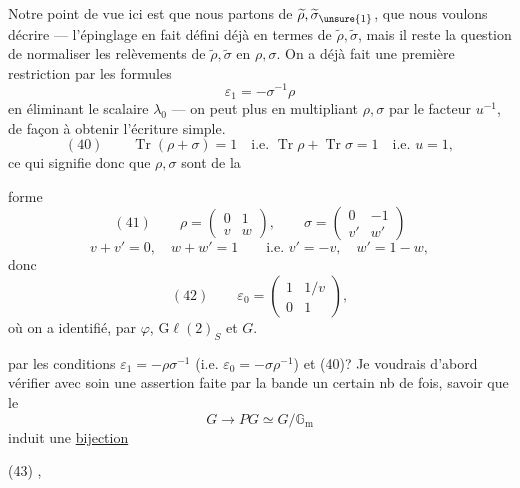 
Notre point de vue ici est que nous partons de $\widetilde\rho,\widetilde\sigma_{\unsure{1}}$, que nous voulons décrire --- l'épinglage  en fait défini déjà en termes de $\widetilde\rho,\widetilde\sigma$, mais il reste la question de normaliser les relèvements de $\widetilde\rho,\widetilde\sigma$ en $\rho,\sigma$. On a déjà fait une première restriction par les formules
\[
\varepsilon_1=-\sigma^{-1}\rho
\]
en éliminant le  scalaire $\lambda_0$ --- on peut  plus en multipliant $\rho,\sigma$ par le facteur $u^{-1}$, de façon à obtenir l'écriture simple.
\[
(40)\qquad\operatorname{Tr}(\rho+\sigma)=1\quad\text{i.e. }\operatorname{Tr}\rho+\operatorname{Tr}\sigma=1\quad\text{i.e. }u=1,
\]
ce qui signifie donc que $\rho,\sigma$ sont de la



forme
\[
(41)\qquad \rho=\begin{pmatrix}0&1\\v&w\end{pmatrix},\qquad
\sigma=\begin{pmatrix}0&-1\\v'&w'\end{pmatrix}
\]
\[
v+v'=0,\quad w+w'=1\qquad\text{i.e. }v'=-v,\quad w'=1-w,
\]
donc
\[
(42)\qquad\varepsilon_0=\begin{pmatrix}1&1/v\\0&1\end{pmatrix},
\]
où on a identifié, par $\varphi$, $\mathrm{G}\ell(2)_S$ et $G$.

 par les conditions $\varepsilon_1=-\rho\sigma^{-1}$ (i.e. $\varepsilon_0=-\sigma\rho^{-1}$) et (40)?
Je voudrais d'abord vérifier avec soin une assertion faite par la bande un certain nb de fois, savoir que le  
\[
G\longrightarrow PG\simeq G/\mathbb G_{\mathrm m}
\]
induit une \uline{bijection}

(43)\quad
{},

